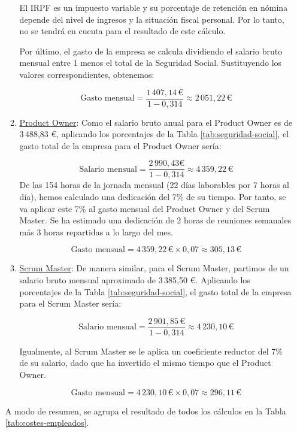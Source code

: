 \begin{enumerate}
\begin{enumerate}
				El IRPF es un impuesto variable y su porcentaje de retención en nómina
				depende del nivel de ingresos y la situación fiscal personal. Por lo tanto,
				no se tendrá en cuenta para el resultado de este cálculo.

				Por último, el gasto de la empresa se calcula dividiendo el salario bruto
				mensual entre 1 menos el total de la Seguridad Social. Sustituyendo los
				valores correspondientes, obtenemos:

				\[
					\text{{Gasto mensual}}= \frac{{1\,407,14 \, \text{{€}}}}{{1 - 0,314 }}\approx
					2\,051,22 \, \text{{€}}
				\]

			\item \underline{Product Owner}: Como el salario bruto anual para el Product
				Owner es de 3\,488,83 €, aplicando los porcentajes de la Tabla
				\ref{tab:seguridad-social}, el gasto total de la empresa para el Product
				Owner sería:

				\[
					\text{{Salario mensual}}= \frac{{2\,990,43 \text{{€}}}}{{1 - 0,314}}\approx
					4\,359,22 \, \text{{€}}
				\]
				De las 154 horas de la jornada mensual (22 días laborables por 7 horas
				al día), hemos calculado una dedicación del 7\% de su tiempo. Por tanto,
				se va aplicar este 7\% al gasto mensual del Product Owner y del Scrum
				Master. Se ha estimado una dedicación de 2 horas de reuniones semanales más
				3 horas repartidas a lo largo del mes.

				\[
					\text{{Gasto mensual}}= 4\,359,22 \, \text{{€}}\times 0,07 \approx 305,
					13 \,\text{{€}}
				\]

			\item \underline{Scrum Master}: De manera similar, para el Scrum Master, partimos
				de un salario bruto mensual aproximado de 3\,385,50 €. Aplicando los
				porcentajes de la Tabla \ref{tab:seguridad-social}, el gasto total de la
				empresa para el Scrum Master sería:

				\[
					\text{{Salario mensual}}= \frac{{2\,901,85 \, \text{{€}}}}{{1 - 0,314 }}
					\approx 4\,230,10 \, \text{{€}}
				\]

				Igualmente, al Scrum Master se le aplica un coeficiente reductor del 7\%
				de su salario, dado que ha invertido el mismo tiempo que el Product Owner.

				\[
					\text{{Gasto mensual}}= 4\,230,10 \, \text{{€}}\times 0,07 \approx 296,
					11 \,\text{{€}}
				\]
		\end{enumerate}

		A modo de resumen, se agrupa el resultado de todos los cálculos en la Tabla \ref{tab:costes-empleados}.


\end{enumerate}
